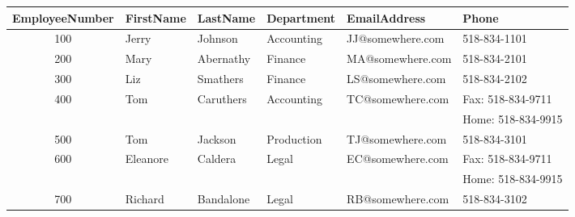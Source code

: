 \begin{NxLightBox}[title={Employee Directory with Multiple Phone Entries}]
		\begin{tabularx}{\textwidth}{|c|X|X|X|X|X|}
				\hline
				EmployeeNumber & FirstName & LastName & Department & EmailAddress & Phone \\
				\hline
				100 & Jerry			& Johnson		& Accounting & JJ@somewhere.com & 518-834-1101 \\
				\hline
				200 & Mary			& Abernathy & Finance		 & MA@somewhere.com & 518-834-2101 \\
				\hline
				300 & Liz				& Smathers	& Finance		 & LS@somewhere.com & 518-834-2102 \\
				\hline
				400 & Tom				& Caruthers & Accounting & TC@somewhere.com & Fax: 518-834-9711 \\ 
						&						&						&						 &									& Home: 518-834-9915 \\
				\hline
				500 & Tom				& Jackson		& Production & TJ@somewhere.com & 518-834-3101 \\
				\hline
				600 & Eleanore	& Caldera		& Legal			 & EC@somewhere.com & Fax: 518-834-9711 \\
						&						&						&						 &									& Home: 518-834-9915 \\
				\hline
				700 & Richard		& Bandalone & Legal			 & RB@somewhere.com & 518-834-3102 \\
				\hline
		\end{tabularx}
\end{NxLightBox}

